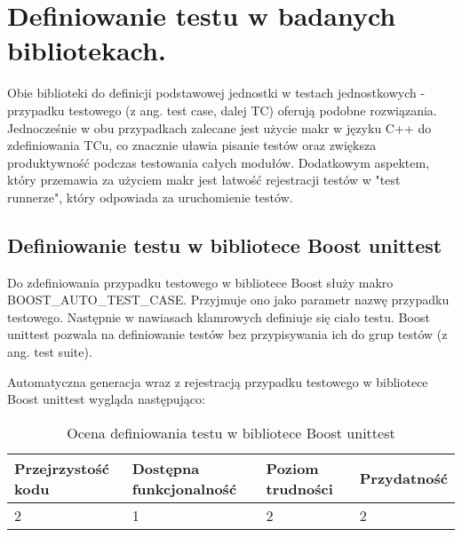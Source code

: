 \documentclass[12pt,a4paper,notitlepage]{report}
\begin{document}
\chapter{Definiowanie testu w badanych bibliotekach.}

Obie biblioteki do definicji podstawowej jednostki w testach jednostkowych - przypadku testowego (z ang. test case, dalej TC) oferują podobne rozwiązania. Jednocześnie w obu przypadkach zalecane jest użycie makr w języku C++ do zdefiniowania TCu, co znacznie uławia pisanie testów oraz zwiększa produktywność podczas testowania całych modułów.
Dodatkowym aspektem, który przemawia za użyciem makr jest łatwość rejestracji testów w "test runnerze", który odpowiada za uruchomienie testów.



\section{Definiowanie testu w bibliotece Boost unittest}

Do zdefiniowania przypadku testowego w bibliotece Boost służy makro BOOST{\_}AUTO{\_}TEST{\_}CASE. Przyjmuje ono jako parametr nazwę przypadku testowego. Następnie w nawiasach klamrowych definiuje się ciało testu. Boost unittest pozwala na definiowanie testów bez przypisywania ich do grup testów (z ang. test suite).

Automatyczna generacja wraz z rejestracją przypadku testowego w bibliotece Boost unittest wygląda następująco:

			

		\begin{center}
			\begin{table}[!ht]
			\caption{Ocena definiowania testu w bibliotece Boost unittest}
			\label{}
			\begin{tabular}[!hc]{|l|l|l|l|}
		\hline
		Przejrzystość kodu 	&	Dostępna funkcjonalność	&	Poziom trudności	&	Przydatność \\ \hline
		2					&	1						&	2					& 	2  			\\ \hline
			\end{tabular}
			\end{table} 
		\end{center}
\end{document}
